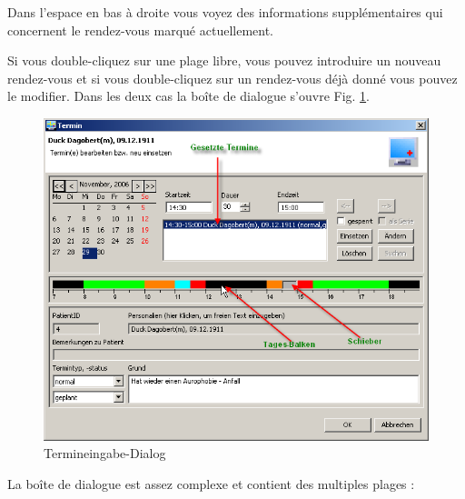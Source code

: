 \medskip

Dans l'espace en bas à droite vous voyez des informations supplémentaires qui concernent le rendez-vous marqué actuellement.

\bigskip

Si vous double-cliquez sur une plage libre, vous pouvez introduire un nouveau rendez-vous et si vous double-cliquez sur un rendez-vous déjà donné vous pouvez le modifier. Dans les deux cas la boîte de dialogue s'ouvre Fig. \ref{fig:termineingabe}.

\begin{figure}[ht]
\includegraphics[width=5in]{images/use4.png}
\caption{Termineingabe-Dialog}\label{fig:termineingabe}
\end{figure}
La boîte de dialogue est assez complexe et contient des multiples plages :

